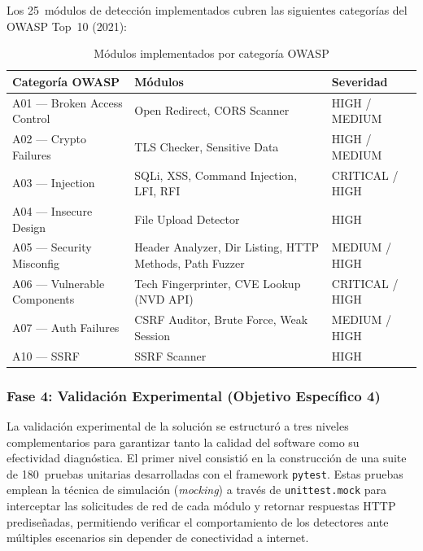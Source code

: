\documentclass[12pt, a4paper]{article}
\begin{document}
Los 25~módulos de detección implementados cubren las siguientes categorías del
OWASP Top~10 (2021):


\begin{table}[H]
    \centering
    \caption{Módulos implementados por categoría OWASP}
    \label{tab:modulos}
    \begin{tabular}{p{3cm} p{5.5cm} p{4cm}}
        \toprule
        \textbf{Categoría OWASP} & \textbf{Módulos} & \textbf{Severidad} \\
        \midrule
        A01 — Broken Access Control &
            Open Redirect, CORS Scanner &
            HIGH / MEDIUM \\
        A02 — Crypto Failures &
            TLS Checker, Sensitive Data &
            HIGH / MEDIUM \\
        A03 — Injection &
            SQLi, XSS, Command Injection, LFI, RFI &
            CRITICAL / HIGH \\
        A04 — Insecure Design &
            File Upload Detector &
            HIGH \\
        A05 — Security Misconfig &
            Header Analyzer, Dir Listing, HTTP Methods, Path Fuzzer &
            MEDIUM / HIGH \\
        A06 — Vulnerable Components &
            Tech Fingerprinter, CVE Lookup (NVD API) &
            CRITICAL / HIGH \\
        A07 — Auth Failures &
            CSRF Auditor, Brute Force, Weak Session &
            MEDIUM / HIGH \\
        A10 — SSRF &
            SSRF Scanner &
            HIGH \\
        \bottomrule
    \end{tabular}
\end{table}

\subsubsection{Fase 4: Validación Experimental (Objetivo Específico 4)}

La validación experimental de la solución se estructuró a tres niveles
complementarios para garantizar tanto la calidad del software como su efectividad
diagnóstica. El primer nivel consistió en la construcción de una suite de 180~pruebas
unitarias desarrolladas con el framework \texttt{pytest}. Estas pruebas emplean la
técnica de simulación (\textit{mocking}) a través de \texttt{unittest.mock} para
interceptar las solicitudes de red de cada módulo y retornar respuestas HTTP
prediseñadas, permitiendo verificar el comportamiento de los detectores ante
múltiples escenarios sin depender de conectividad a internet.
\end{document}
